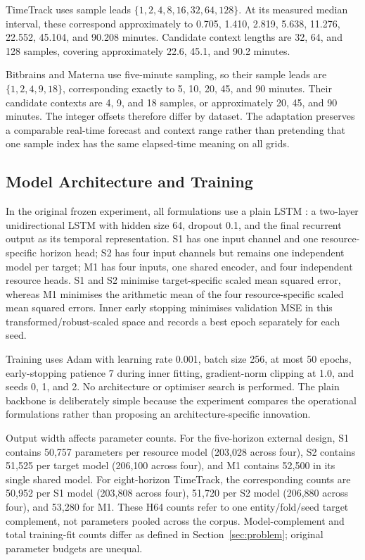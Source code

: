 \documentclass[5p,twocolumn]{elsarticle}
\begin{document}
TimeTrack uses sample leads
$\{1,2,4,8,16,32,64,128\}$.  At its measured median interval, these correspond
approximately to 0.705, 1.410, 2.819, 5.638, 11.276, 22.552, 45.104, and
90.208 minutes.  Candidate context lengths are 32, 64, and 128 samples,
covering approximately 22.6, 45.1, and 90.2 minutes.

Bitbrains and Materna use five-minute sampling, so their sample leads are
$\{1,2,4,9,18\}$, corresponding exactly to 5, 10, 20, 45, and 90 minutes.
Their candidate contexts are 4, 9, and 18 samples, or approximately 20, 45,
and 90 minutes.  The integer offsets therefore differ by dataset.  The
adaptation preserves a comparable real-time forecast and context range rather
than pretending that one sample index has the same elapsed-time meaning on all
grids.

\subsection{Model Architecture and Training}
\label{sec:architecture-training}

In the original frozen experiment, all formulations use a plain LSTM
\citep{Hochreiter1997LSTM}: a two-layer
unidirectional LSTM with hidden size 64, dropout 0.1, and the final recurrent
output as its temporal representation.  S1 has one input channel and one
resource-specific horizon head; S2 has four input channels but remains one
independent model per target; M1 has four inputs, one shared encoder, and four
independent resource heads.  S1 and S2 minimise target-specific scaled mean
squared error, whereas M1 minimises the arithmetic mean of the four
resource-specific scaled mean squared errors. Inner early stopping minimises
validation MSE in this transformed/robust-scaled space and records a best
epoch separately for each seed.

Training uses Adam with learning rate 0.001, batch size 256, at most 50 epochs,
early-stopping patience 7 during inner fitting, gradient-norm clipping at 1.0,
and seeds 0, 1, and 2.  No architecture or optimiser search is performed.  The
plain backbone is deliberately simple because the experiment compares the
operational formulations rather than proposing an architecture-specific
innovation.

Output width affects parameter counts.  For the five-horizon external design,
S1 contains 50,757 parameters per resource model (203,028 across four), S2
contains 51,525 per target model (206,100 across four), and M1 contains 52,500
in its single shared model.  For eight-horizon TimeTrack, the corresponding
counts are 50,952 per S1 model (203,808 across four), 51,720 per S2 model
(206,880 across four), and 53,280 for M1. These H64 counts refer to one
entity/fold/seed target complement, not parameters pooled across the corpus.
Model-complement and total training-fit counts differ as defined in
Section~\ref{sec:problem}; original parameter budgets are unequal.
\end{document}
